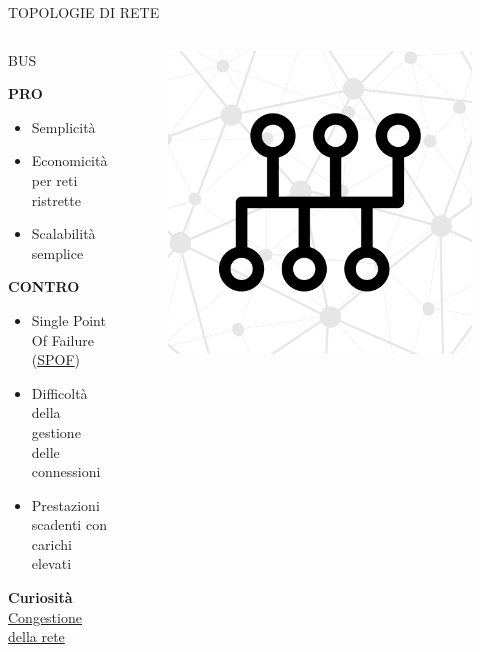 \documentclass[aspectratio=1610]{beamer}
\begin{document}
\begin{frame}{TOPOLOGIE DI RETE}
    \begin{columns}
            \justifying
            \begin{alertblock}{BUS}
                \begin{minipage}{0.96\linewidth}
                    \justifying
                    \textbf{PRO}
                    \begin{itemize}
                        \item Semplicità
                        \pause
                        \item Economicità per reti ristrette
                        \pause
                        \item Scalabilità semplice
                    \end{itemize}
                    \pause
                    \textbf{CONTRO}
                    \begin{itemize}
                        \item Single Point Of Failure (\href{https://it.wikipedia.org/wiki/Single_point_of_failure}{SPOF})
                        \pause
                        \item Difficoltà della gestione delle connessioni
                        \pause
                        \item Prestazioni scadenti con carichi elevati
                    \end{itemize}
                    \tiny{\textbf{Curiosità}}\\
                    \tiny{\href{https://www.fastweb.it/fastweb-plus/digital-magazine/congestione-della-rete-cosa-fare/}{Congestione della rete}}
                \end{minipage}
            \end{alertblock}
            \begin{figure}
                \includegraphics[width=\linewidth]{img/bus.png}

\end{figure}
\end{columns}
\end{frame}
\end{document}
